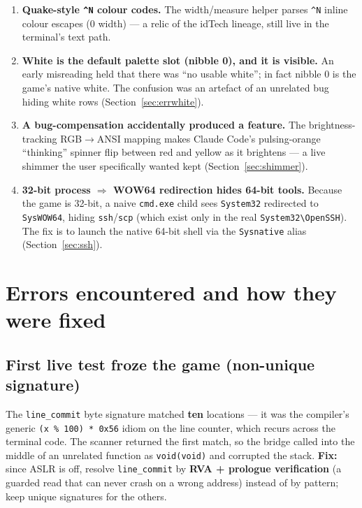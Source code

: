 \documentclass[11pt]{article}
\newcommand{\ic}[1]{\texttt{#1}}
\begin{document}
\begin{enumerate}[label=\textbf{F\arabic*.},leftmargin=*]
  \item \textbf{Quake-style \texttt{\textasciicircum{}N} colour codes.} The width/measure
  helper parses \ic{\textasciicircum N} inline colour escapes (0 width) --- a relic of the idTech
  lineage, still live in the terminal's text path.

  \item \textbf{White is the default palette slot (nibble 0), and it is visible.} An
  early misreading held that there was ``no usable white''; in fact nibble 0 is the
  game's native white. The confusion was an artefact of an unrelated bug hiding white
  rows (Section~\ref{sec:errwhite}).

  \item \textbf{A bug-compensation accidentally produced a feature.} The brightness-tracking
  RGB$\rightarrow$ANSI mapping makes Claude Code's pulsing-orange ``thinking'' spinner
  flip between red and yellow as it brightens --- a live shimmer the user specifically
  wanted kept (Section~\ref{sec:shimmer}).

  \item \textbf{32-bit process $\Rightarrow$ WOW64 redirection hides 64-bit tools.}
  Because the game is 32-bit, a naive \texttt{cmd.exe} child sees
  \texttt{System32} redirected to \texttt{SysWOW64}, hiding \texttt{ssh}/\texttt{scp}
  (which exist only in the real \texttt{System32\textbackslash OpenSSH}). The fix is to
  launch the native 64-bit shell via the \texttt{Sysnative} alias
  (Section~\ref{sec:ssh}).
\end{enumerate}

\section{Errors encountered and how they were fixed}

\subsection{First live test froze the game (non-unique signature)}
The \texttt{line_commit} byte signature matched \textbf{ten} locations --- it was the
compiler's generic \ic{(x \% 100) * 0x56} idiom on the line counter, which recurs across
the terminal code. The scanner returned the first match, so the bridge called into the
middle of an unrelated function as \ic{void(void)} and corrupted the stack.
\textbf{Fix:} since ASLR is off, resolve \texttt{line_commit} by \textbf{RVA +
prologue verification} (a guarded read that can never crash on a wrong address) instead
of by pattern; keep unique signatures for the others.
\end{document}
